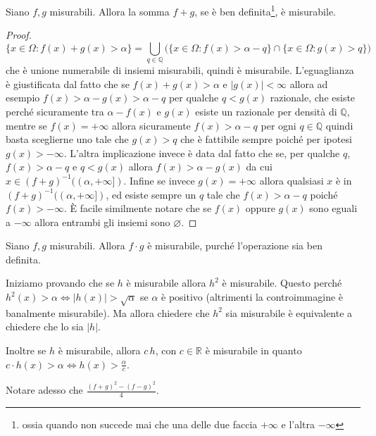 \begin{proposition}
    Siano \(f, g\) misurabili. Allora la somma \(f+g\), se è ben
    definita\footnote{ossia quando non succede mai che una delle due faccia
    \(+\infty\) e l'altra \(-\infty\)}, è
    misurabile.
\end{proposition}
\begin{proof}
    \[
        \{x \in \Omega : f(x) + g(x) > \alpha\} = \bigcup_{q \in \mathbb{Q}}
        \big( \{x \in \Omega : f(x) > \alpha - q\} \cap \{x \in \Omega: g(x) >
            q\} \big)
    \]
    che è unione numerabile di insiemi misurabili, quindi è misurabile.
    L'eguaglianza è giustificata dal fatto che se \(f(x) + g(x) > \alpha\) e
    \(|g(x)| < \infty\) 
    allora ad esempio \(f(x) > \alpha - g(x) > \alpha - q\) per qualche \(q <
    g(x)\) razionale, che esiste perché sicuramente tra \(\alpha - f(x)\) e
    \(g(x)\) esiste un razionale per densità di \(\mathbb{Q}\), mentre se \(f(x)
    = +\infty\) allora sicuramente \(f(x) > \alpha - q\) per ogni \(q \in
    \mathbb{Q}\) quindi basta sceglierne uno tale che \(g(x) > q\) che è
    fattibile sempre poiché per ipotesi \(g(x) > -\infty\). L'altra
    implicazione invece è data dal fatto che se, per
    qualche \(q\), \(f(x) > \alpha - q\) e \(q < g(x)\) allora \(f(x) > \alpha -
    g(x)\) da cui \(x \in {(f+g)}^{-1}((\alpha, +\infty])\). Infine se invece \(g(x) =
    +\infty\) allora qualsiasi \(x\) è in \({(f+g)}^{-1}((\alpha, +\infty])\),
    ed esiste sempre un \(q\) tale che \(f(x) > \alpha - q\) poiché \(f(x) >
    -\infty\). È facile similmente notare che se \(f(x)\) oppure \(g(x)\) sono
    eguali a \(-\infty\) allora entrambi gli insiemi sono \(\varnothing\).
\end{proof}

\begin{proposition}
    Siano \(f, g\) misurabili. Allora \(f\cdot g\) è misurabile, purché
    l'operazione sia ben definita.
\end{proposition}
\begin{proposition}
    Iniziamo provando che se \(h\) è misurabile allora \(h^{2}\) è misurabile.
    Questo perché \(h^2(x) > \alpha \iff |h(x)| > \sqrt{\alpha}\) se \(\alpha\)
    è positivo (altrimenti la controimmagine è banalmente misurabile). Ma allora
    chiedere che \(h^2\) sia misurabile è equivalente a chiedere che lo sia
    \(|h|\).

    Inoltre se \(h\) è misurabile, allora \(c\, h\), con \(c \in \mathbb{R}\)
    è misurabile in quanto \(c\cdot h(x) > \alpha \iff h(x) >
    \frac{\alpha}{c}\).

    Notare adesso che \(\displaystyle \frac{{(f+g)}^2 - {(f-g)}^2}{4}\). 
\end{proposition}

